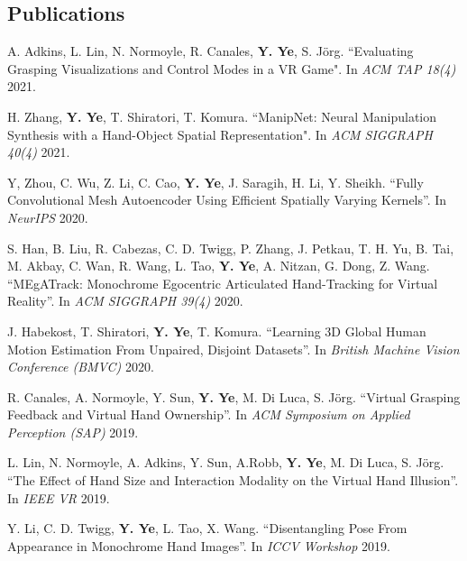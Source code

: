 \documentclass[margin,line]{res}
\begin{document}
\begin{resume}
\section{\sc Publications}

A. Adkins, L. Lin, N. Normoyle, R. Canales, {\bf Y. Ye}, S. J\"{o}rg. ``Evaluating Grasping Visualizations and Control Modes in a VR Game". In {\em ACM TAP 18(4)} 2021.

\vspace*{-.1in}
H. Zhang, {\bf Y. Ye}, T. Shiratori, T. Komura. ``ManipNet: Neural Manipulation Synthesis with a Hand-Object Spatial Representation". In {\em ACM SIGGRAPH 40(4)} 2021.

\vspace*{-.1in}
Y, Zhou, C. Wu, Z. Li, C. Cao, {\bf Y. Ye}, J. Saragih, H. Li, Y. Sheikh. ``Fully Convolutional Mesh Autoencoder Using Efficient Spatially Varying Kernels''. In {\em NeurIPS} 2020.

\vspace*{-.1in}
S. Han, B. Liu, R. Cabezas, C. D. Twigg, P. Zhang, J. Petkau, T. H. Yu, B. Tai, M. Akbay, C. Wan, R. Wang, L. Tao, {\bf Y. Ye}, A. Nitzan, G. Dong, Z. Wang. ``MEgATrack: Monochrome Egocentric Articulated Hand-Tracking for Virtual Reality''. In {\em ACM SIGGRAPH 39(4)} 2020.


\vspace*{-.1in}
J. Habekost, T. Shiratori, {\bf Y. Ye}, T. Komura. ``Learning 3D Global Human Motion Estimation From Unpaired, Disjoint Datasets''. In {\em British Machine Vision Conference (BMVC)} 2020.

\vspace*{-.1in}
R. Canales, A. Normoyle, Y. Sun, {\bf Y. Ye}, M. Di Luca, S. J\"{o}rg. ``Virtual Grasping Feedback and Virtual Hand Ownership''. In {\em ACM Symposium on Applied Perception (SAP)} 2019.

\vspace*{-.1in}
L. Lin, N. Normoyle, A. Adkins, Y. Sun, A.Robb, {\bf Y. Ye}, M. Di Luca, S. J\"{o}rg. ``The Effect of Hand Size and Interaction Modality on the Virtual Hand Illusion''. In {\em IEEE VR} 2019.

\vspace*{-.1in}
Y. Li, C. D. Twigg, {\bf Y. Ye}, L. Tao, X. Wang. ``Disentangling Pose From Appearance in Monochrome Hand Images''. In {\em ICCV Workshop} 2019.


\end{resume}
\end{document}

